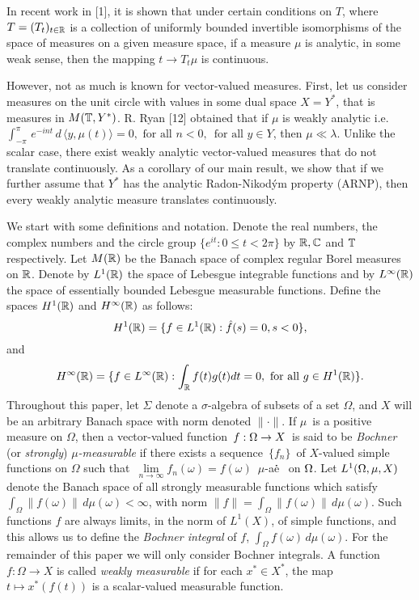 In recent work in [1], it is shown that under certain conditions on
 $T$, where $T=(T_t)_{ t\in \Bbb R}$ is  a collection of uniformly bounded
invertible isomorphisms of the space of measures on a given measure
space,
 if a measure
$\mu$ is analytic, in some weak sense,
then the mapping $t\to T_t \mu$ is continuous.

   However, not as much is known for vector-valued measures.
First, let us consider measures on the unit circle with values in
some dual space $X=Y^*$, that is measures in $M(\Bbb T,Y^*)$. R. Ryan
[12] obtained
that if $\mu$ is  weakly analytic i.e.
 $\int_{-\pi}^{\pi}\,e^{-int}\,d\,\langle y,\mu (t)\rangle=0,$
$\text{for all }
 n<0,\,\text{ for all } y\in Y$, then $\mu \ll \lambda$. Unlike the
scalar
case, there exist weakly analytic vector-valued measures that do
not translate
continuously.
As a corollary of our main result, we show that if we further
assume that $Y^*$
has the analytic Radon-Nikod\'ym property (ARNP), then every weakly
analytic measure translates continuously.


   We start with some definitions and notation.
   Denote  the real numbers, the complex numbers  and 	the circle
group $\{
e^{it}: 0\le t<2\pi\}$ by $\Bbb R , \Bbb C$  and $\Bbb T$ respectively. Let
$M(\Bbb R)$ be the
Banach space of complex  regular Borel measures on $\Bbb R$.
Denote by $ L^{1}({\Bbb R})$ the space of Lebesgue integrable functions
and by
$L^{\infty}({\Bbb R})$ the space of essentially bounded  Lebesgue measurable
functions. Define the spaces $H^{1}({\Bbb R})$ and $H^{\infty}({\Bbb R})$
as follows:
$$H^{1}({\Bbb R})= \{ f\in L^1(\Bbb R ) :\hat  f  (s)=0, s<0\},$$
and
$$H^{\infty}({\Bbb R})=\{ f\in L^{\infty}({\Bbb R}): \int_{\Bbb R} f(t)g(t) dt=0,
\text{ for all }g\in H^{1}({\Bbb R})\}.$$
   Throughout this paper, let $\Sigma$  denote a $\sigma$-algebra
of subsets
 of a set $\Omega$, and $X$ will be an arbitrary Banach space
with norm denoted $\|\cdot\|$. If $\mu$\ is a positive
measure on $\Omega$, then a vector-valued function\
$f:\Omega \to X$\ is said to be {\it Bochner\/} (or {\it strongly\/})
{\it $\mu$-measurable\/} if there exists a sequence\ $\{f_n\}$\ of
$X$-valued simple functions on $\Omega$ such that\
$\lim\limits_{n\to\infty} f_n(\omega) = f(\omega)$\
$\mu$-a\.e\.~ on $\Omega$.
Let $L^{1}({\Omega},\mu,X)$ denote the Banach space of all strongly
measurable functions which satisfy
$\int_{\Omega}\|f(\omega)\|\,d\mu(\omega) < \infty$, with norm
$\|f\|=\int_{\Omega}\|f(\omega)\|\,d\mu(\omega)$.
Such functions $f$ are always limits, in the norm of
$L^1(X)$, of simple functions,
and this allows us to define the {\it Bochner integral\/} of $f$,
$\int_\Omega f(\omega)\,d\mu(\omega)$.
For the remainder of this paper we will only consider Bochner integrals.
A function $f:\Omega\to X$ is called {\it weakly measurable\/} if for
each $x^*\in X^*$, the map $t\mapsto x^*(f(t))$ is a  scalar-valued
measurable function.

